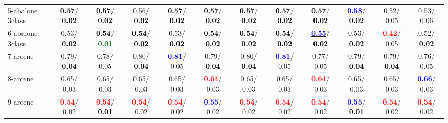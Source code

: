 \begin{table}[h]
\begin{center}
{\begin{tabular}{lc|c|c|c|c|c|c|c|c|c|c}
5-abalone 3class & \textcolor{black}{\textbf{  0.57}}/\textcolor{black}{\textbf{  0.02}} & \textcolor{black}{\textbf{  0.57}}/\textcolor{black}{\textbf{  0.02}} &   0.56/\textcolor{black}{\textbf{  0.02}} & \textcolor{black}{\textbf{  0.57}}/\textcolor{black}{\textbf{  0.02}} & \textcolor{black}{\textbf{  0.57}}/\textcolor{black}{\textbf{  0.02}} & \textcolor{black}{\textbf{  0.57}}/\textcolor{black}{\textbf{  0.02}} & \textcolor{black}{\textbf{  0.57}}/\textcolor{black}{\textbf{  0.02}} & \textcolor{black}{\textbf{  0.57}}/\textcolor{black}{\textbf{  0.02}} & \underline{\textcolor{blue}{\textbf{  0.58}}}/\textcolor{black}{\textbf{  0.02}} &   0.52/  0.05 &   0.53/  0.06 \\
6-abalone 3class &   0.53/\textcolor{black}{\textbf{  0.02}} & \textcolor{black}{\textbf{  0.54}}/\textcolor{darkgreen}{\textbf{  0.01}} & \textcolor{black}{\textbf{  0.54}}/\textcolor{black}{\textbf{  0.02}} &   0.53/\textcolor{black}{\textbf{  0.02}} & \textcolor{black}{\textbf{  0.54}}/\textcolor{black}{\textbf{  0.02}} & \textcolor{black}{\textbf{  0.54}}/\textcolor{black}{\textbf{  0.02}} & \textcolor{black}{\textbf{  0.54}}/\textcolor{black}{\textbf{  0.02}} & \underline{\textcolor{blue}{\textbf{  0.55}}}/\textcolor{black}{\textbf{  0.02}} &   0.53/\textcolor{black}{\textbf{  0.02}} & \textcolor{red}{\textbf{  0.42}}/  0.05 &   0.52/\textcolor{black}{\textbf{  0.02}} \\
7-arcene &   0.79/\textcolor{black}{\textbf{  0.04}} &   0.78/  0.05 &   0.80/\textcolor{black}{\textbf{  0.04}} & \textcolor{blue}{\textbf{  0.81}}/  0.05 &   0.79/\textcolor{black}{\textbf{  0.04}} &   0.80/\textcolor{black}{\textbf{  0.04}} & \textcolor{blue}{\textbf{  0.81}}/  0.05 &   0.77/  0.05 &   0.79/\textcolor{black}{\textbf{  0.04}} &   0.79/\textcolor{black}{\textbf{  0.04}} &   0.76/  0.05 \\ \hline
8-arcene &   0.65/  0.03 &   0.65/  0.03 &   0.65/  0.03 &   0.65/  0.03 & \textcolor{red}{\textbf{  0.64}}/  0.03 &   0.65/  0.03 &   0.65/  0.03 & \textcolor{red}{\textbf{  0.64}}/  0.03 &   0.65/  0.03 &   0.65/  0.03 & \textcolor{blue}{\textbf{  0.66}}/  0.03 \\
9-arcene & \textcolor{red}{\textbf{  0.54}}/  0.02 & \textcolor{red}{\textbf{  0.54}}/\textcolor{black}{\textbf{  0.01}} & \textcolor{red}{\textbf{  0.54}}/  0.02 & \textcolor{red}{\textbf{  0.54}}/  0.02 & \textcolor{blue}{\textbf{  0.55}}/  0.02 & \textcolor{red}{\textbf{  0.54}}/  0.02 & \textcolor{red}{\textbf{  0.54}}/  0.02 & \textcolor{red}{\textbf{  0.54}}/  0.02 & \textcolor{blue}{\textbf{  0.55}}/\textcolor{black}{\textbf{  0.01}} & \textcolor{red}{\textbf{  0.54}}/  0.02 & \textcolor{red}{\textbf{  0.54}}/  0.02 \\

\end{tabular}}
\end{center}
\end{table}
